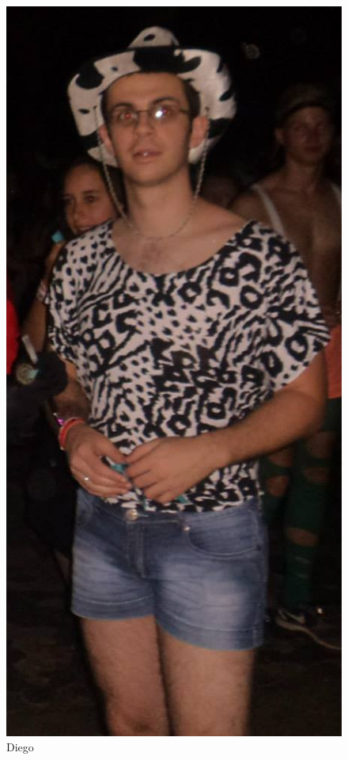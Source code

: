 \documentclass{beamer}
\begin{document}
\begin{frame}
\begin{center}
\begin{columns}[c]
\begin{figure}
\begin{center}
                \includegraphics[height=.5\textheight]{images/diego.jpg}
                \caption{Diego}
              \end{center}
            \end{figure}
        \end{columns}
      \end{center}
    \end{frame}
\end{document}
